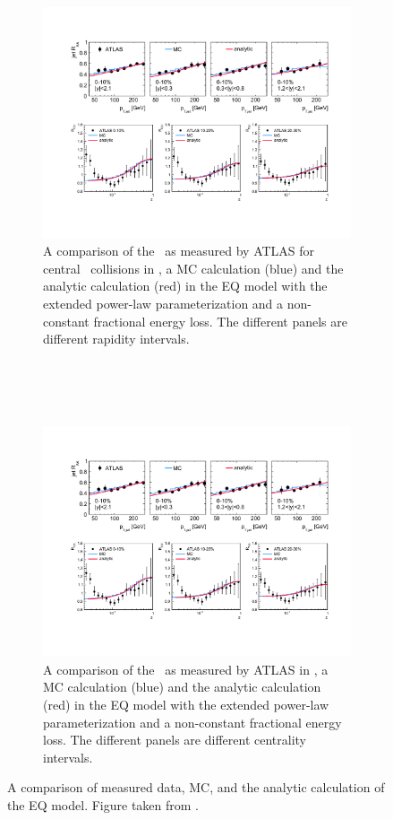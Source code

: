 \begin{figure}
\begin{subfigure}{1\textwidth}
  \centering
\includegraphics[width=1\textwidth]{figures/jetMeasurements/EQ_RAA}
\caption{A comparison of the \RAA\ as measured by ATLAS for central \pbpb\ collisions in \cite{Aad:2014bxa}, a MC calculation (blue) and the analytic calculation (red) in the EQ model with the extended power-law parameterization and a non-constant fractional energy loss.
The different panels are different rapidity intervals.}
\label{fig:EQ_RAA}
\end{subfigure} \\ \\ \\
\begin{subfigure}{1\textwidth}
  \centering
\includegraphics[width=1\textwidth]{figures/jetMeasurements/eq_FF}
\caption{A comparison of the \Rdz\ as measured by ATLAS in \cite{Aad:2014wha}, a MC calculation (blue) and the analytic calculation (red) in the EQ model with the extended power-law parameterization and a non-constant fractional energy loss.
The different panels are different centrality intervals.}
\label{fig:EQ_FF}
\end{subfigure}
\caption{A comparison of measured data, MC, and the analytic calculation of the EQ model.
Figure taken from \cite{Spousta:2015fca}.}
\label{fig:EQ_modification}
\end{figure}

